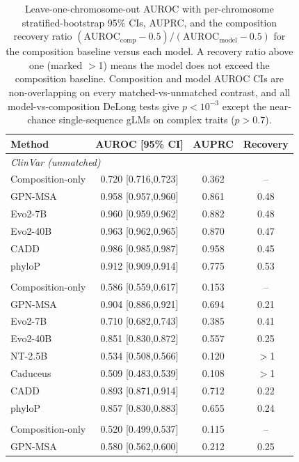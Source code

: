 \documentclass[pmlr]{jmlr}
\begin{document}
\begin{table}[t]
\centering
\caption{Leave-one-chromosome-out AUROC with per-chromosome stratified-bootstrap 95\% CIs,
AUPRC, and the composition recovery ratio
$(\text{AUROC}_{\text{comp}}-0.5)/(\text{AUROC}_{\text{model}}-0.5)$ for the composition
baseline versus each model. A recovery ratio above one (marked $>$1) means the model does not
exceed the composition baseline. Composition and model AUROC CIs are non-overlapping on every
matched-vs-unmatched contrast, and all model-vs-composition DeLong tests give $p<10^{-3}$
except the near-chance single-sequence gLMs on complex traits ($p>0.7$).}
\label{tab:main}
\small
\begin{tabular}{lccc}
\toprule
Method & AUROC [95\% CI] & AUPRC & Recovery \\
\midrule
\multicolumn{4}{l}{\emph{ClinVar (unmatched)}}\\
\quad Composition-only & 0.720 [0.716,0.723] & 0.362 & -- \\
\quad GPN-MSA & 0.958 [0.957,0.960] & 0.861 & 0.48 \\
\quad Evo2-7B & 0.960 [0.959,0.962] & 0.882 & 0.48 \\
\quad Evo2-40B & 0.963 [0.962,0.965] & 0.870 & 0.47 \\
\quad CADD & 0.986 [0.985,0.987] & 0.958 & 0.45 \\
\quad phyloP & 0.912 [0.909,0.914] & 0.775 & 0.53 \\
\addlinespace
\multicolumn{4}{l}{\emph{TraitGym Mendelian (matched)}}\\
\quad Composition-only & 0.586 [0.559,0.617] & 0.153 & -- \\
\quad GPN-MSA & 0.904 [0.886,0.921] & 0.694 & 0.21 \\
\quad Evo2-7B & 0.710 [0.682,0.743] & 0.385 & 0.41 \\
\quad Evo2-40B & 0.851 [0.830,0.872] & 0.557 & 0.25 \\
\quad NT-2.5B & 0.534 [0.508,0.566] & 0.120 & $>$1 \\
\quad Caduceus & 0.509 [0.483,0.539] & 0.108 & $>$1 \\
\quad CADD & 0.893 [0.871,0.914] & 0.712 & 0.22 \\
\quad phyloP & 0.857 [0.830,0.883] & 0.655 & 0.24 \\
\addlinespace
\multicolumn{4}{l}{\emph{TraitGym complex (matched)}}\\
\quad Composition-only & 0.520 [0.499,0.537] & 0.115 & -- \\
\quad GPN-MSA & 0.580 [0.562,0.600] & 0.212 & 0.25 \\

\end{tabular}
\end{table}
\end{document}
